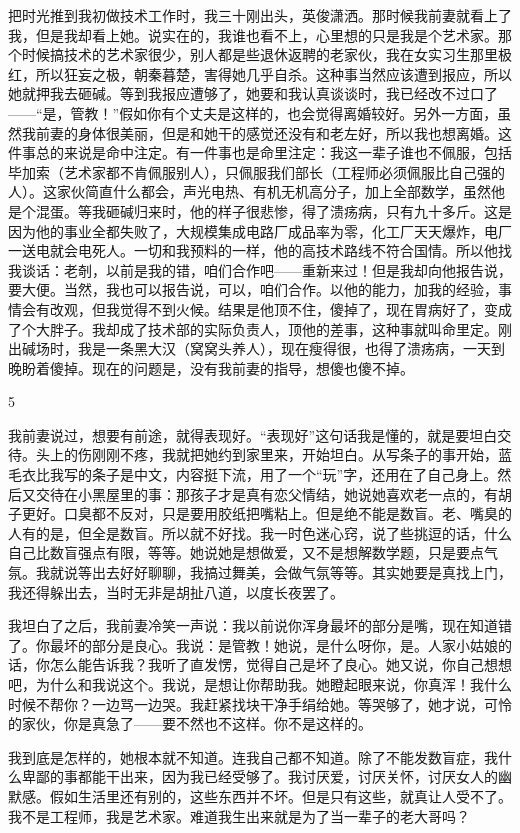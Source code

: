 把时光推到我初做技术工作时，我三十刚出头，英俊潇洒。那时候我前妻就看上了我，但是我却看上她。说实在的，我谁也看不上，心里想的只是我是个艺术家。那个时候搞技术的艺术家很少，别人都是些退休返聘的老家伙，我在女实习生那里极红，所以狂妄之极，朝秦暮楚，害得她几乎自杀。这种事当然应该遭到报应，所以她就押我去砸碱。等到我报应遭够了，她要和我认真谈谈时，我已经改不过口了——“是，管教！”假如你有个丈夫是这样的，也会觉得离婚较好。另外一方面，虽然我前妻的身体很美丽，但是和她干的感觉还没有和老左好，所以我也想离婚。这件事总的来说是命中注定。有一件事也是命里注定：我这一辈子谁也不佩服，包括毕加索（艺术家都不肯佩服别人），只佩服我们部长（工程师必须佩服比自己强的人）。这家伙简直什么都会，声光电热、有机无机高分子，加上全部数学，虽然他是个混蛋。等我砸碱归来时，他的样子很悲惨，得了溃疡病，只有九十多斤。这是因为他的事业全都失败了，大规模集成电路厂成品率为零，化工厂天天爆炸，电厂一送电就会电死人。一切和我预料的一样，他的高技术路线不符合国情。所以他找我谈话：老剞，以前是我的错，咱们合作吧——重新来过！但是我却向他报告说，要大便。当然，我也可以报告说，可以，咱们合作。以他的能力，加我的经验，事情会有改观，但我觉得不到火候。结果是他顶不住，傻掉了，现在胃病好了，变成了个大胖子。我却成了技术部的实际负责人，顶他的差事，这种事就叫命里定。刚出碱场时，我是一条黑大汉（窝窝头养人），现在瘦得很，也得了溃疡病，一天到晚盼着傻掉。现在的问题是，没有我前妻的指导，想傻也傻不掉。 



5 

我前妻说过，想要有前途，就得表现好。“表现好”这句话我是懂的，就是要坦白交待。头上的伤刚刚不疼，我就把她约到家里来，开始坦白。从写条子的事开始，蓝毛衣比我写的条子是中文，内容挺下流，用了一个“玩”字，还用在了自己身上。然后又交待在小黑屋里的事：那孩子才是真有恋父情结，她说她喜欢老一点的，有胡子更好。口臭都不反对，只是要用胶纸把嘴粘上。但是绝不能是数盲。老、嘴臭的人有的是，但全是数盲。所以就不好找。我一时色迷心窍，说了些挑逗的话，什么自己比数盲强点有限，等等。她说她是想做爱，又不是想解数学题，只是要点气氛。我就说等出去好好聊聊，我搞过舞美，会做气氛等等。其实她要是真找上门，我还得躲出去，当时无非是胡扯八道，以度长夜罢了。 

我坦白了之后，我前妻冷笑一声说：我以前说你浑身最坏的部分是嘴，现在知道错了。你最坏的部分是良心。我说：是管教！她说，是什么呀你，是。人家小姑娘的话，你怎么能告诉我？我听了直发愣，觉得自己是坏了良心。她又说，你自己想想吧，为什么和我说这个。我说，是想让你帮助我。她瞪起眼来说，你真浑！我什么时候不帮你？一边骂一边哭。我赶紧找块干净手绢给她。等哭够了，她才说，可怜的家伙，你是真急了——要不然也不这样。你不是这样的。 

我到底是怎样的，她根本就不知道。连我自己都不知道。除了不能发数盲症，我什么卑鄙的事都能干出来，因为我已经受够了。我讨厌爱，讨厌关怀，讨厌女人的幽默感。假如生活里还有别的，这些东西并不坏。但是只有这些，就真让人受不了。我不是工程师，我是艺术家。难道我生出来就是为了当一辈子的老大哥吗？ 

